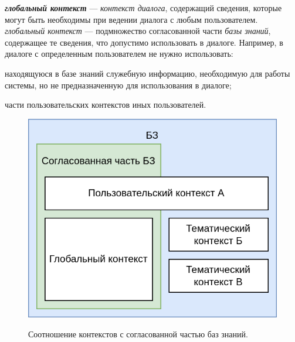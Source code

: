 \textbf{\textit{глобальный контекст}} --- \textit{контекст диалога}, содержащий сведения, которые могут быть необходимы при ведении диалога с любым пользователем.
    \textit{глобальный контекст} --- подмножество согласованной части \textit{базы знаний}, содержащее те сведения, что допустимо использовать в диалоге.
Например, в диалоге с определенным пользователем не нужно использовать:
\begin{textitemize}
    \item находящуюся в базе знаний служебную информацию, необходимую для работы системы, но не предназначенную для использования в диалоге;
    \item части пользовательских контекстов иных пользователей.
\end{textitemize}

\begin{figure}[H]
    \centering
    \caption{Соотношение контекстов с согласованной частью баз знаний.}
    \includegraphics[scale=0.3]{images/part4/chapter_nl_interfaces/context_in_KB}
    \label{fig:context_in_KB}
\end{figure}

\begin{SCn}

    \begin{scnindent}
        \begin{scneqtoset}
        \end{scneqtoset}
    \end{scnindent}

\end{SCn}


